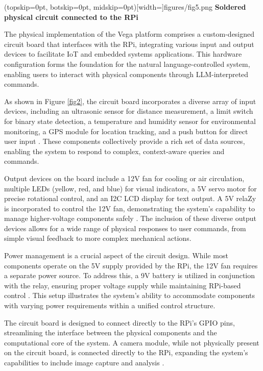 \documentclass{ieeeaccess}
\begin{document}
\Figure[t!](topskip=0pt, botskip=0pt,
midskip=0pt)[width=\textwidth]{{figures/fig5.png}}
{ \textbf{Soldered physical circuit connected to the RPi }\label{fig2}}

The physical implementation of the Vega platform comprises a custom-designed circuit board that interfaces with the RPi, integrating various input and output devices to facilitate IoT and embedded systems applications. This hardware configuration forms the foundation for the natural language-controlled system, enabling users to interact with physical components through LLM-interpreted commands.

As shown in Figure \ref{fig2}, the circuit board incorporates a diverse array of input devices, including an ultrasonic sensor for distance measurement, a limit switch for binary state detection, a temperature and humidity sensor for environmental monitoring, a GPS module for location tracking, and a push button for direct user input \cite{electronicwings_sensors_modules}. These components collectively provide a rich set of data sources, enabling the system to respond to complex, context-aware queries and commands.

Output devices on the board include a 12V fan for cooling or air circulation, multiple LEDs (yellow, red, and blue) for visual indicators, a 5V servo motor for precise rotational control, and an I2C LCD display for text output. A 5V relaZy is incorporated to control the 12V fan, demonstrating the system's capability to manage higher-voltage components safely \cite{smith2020}. The inclusion of these diverse output devices allows for a wide range of physical responses to user commands, from simple visual feedback to more complex mechanical actions.

Power management is a crucial aspect of the circuit design. While most components operate on the 5V supply provided by the RPi, the 12V fan requires a separate power source. To address this, a 9V battery is utilized in conjunction with the relay, ensuring proper voltage supply while maintaining RPi-based control \cite{monk2019}. This setup illustrates the system's ability to accommodate components with varying power requirements within a unified control structure.

The circuit board is designed to connect directly to the RPi's GPIO pins, streamlining the interface between the physical components and the computational core of the system. A camera module, while not physically present on the circuit board, is connected directly to the RPi, expanding the system's capabilities to include image capture and analysis \cite{pi_camera_2018}.
\end{document}
